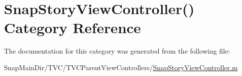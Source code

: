 \hypertarget{category_snap_story_view_controller_07_08}{}\section{Snap\+Story\+View\+Controller() Category Reference}
\label{category_snap_story_view_controller_07_08}


The documentation for this category was generated from the following file\+:\begin{DoxyCompactItemize}
\item 
Snap\+Main\+Dir/\+T\+V\+C/\+T\+V\+C\+Parent\+View\+Controllers/\hyperlink{_snap_story_view_controller_8m}{Snap\+Story\+View\+Controller.\+m}\end{DoxyCompactItemize}
